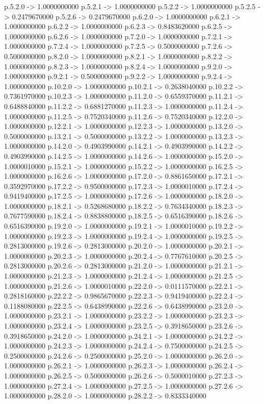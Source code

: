   p.5.2.0 -> 1.0000000000    p.5.2.1 -> 1.0000000000    p.5.2.2 -> 1.0000000000    p.5.2.5 -> 0.2479670000    p.5.2.6 -> 0.2479670000    p.6.2.0 -> 1.0000000000    p.6.2.1 -> 1.0000000000    p.6.2.2 -> 1.0000000000    p.6.2.3 -> 0.8483620000    p.6.2.5 -> 1.0000000000    p.6.2.6 -> 1.0000000000    p.7.2.0 -> 1.0000000000    p.7.2.1 -> 1.0000000000    p.7.2.4 -> 1.0000000000    p.7.2.5 -> 0.5000000000    p.7.2.6 -> 0.5000000000    p.8.2.0 -> 1.0000000000    p.8.2.1 -> 1.0000000000    p.8.2.2 -> 1.0000000000    p.8.2.3 -> 1.0000000000    p.8.2.4 -> 1.0000000000    p.9.2.0 -> 1.0000000000    p.9.2.1 -> 0.5000000000    p.9.2.2 -> 1.0000000000    p.9.2.4 -> 1.0000000000    p.10.2.0 -> 1.0000000000    p.10.2.1 -> 0.2638040000    p.10.2.2 -> 0.7361970000    p.10.2.3 -> 1.0000000000    p.11.2.0 -> 0.6559370000    p.11.2.1 -> 0.6488840000    p.11.2.2 -> 0.6881270000    p.11.2.3 -> 1.0000000000    p.11.2.4 -> 1.0000000000    p.11.2.5 -> 0.7520340000    p.11.2.6 -> 0.7520340000    p.12.2.0 -> 1.0000000000    p.12.2.1 -> 1.0000000000    p.12.2.3 -> 1.0000000000    p.13.2.0 -> 0.5000000000    p.13.2.1 -> 0.5000000000    p.13.2.2 -> 1.0000000000    p.13.2.3 -> 1.0000000000    p.14.2.0 -> 0.4903990000    p.14.2.1 -> 0.4903990000    p.14.2.2 -> 0.4903990000    p.14.2.5 -> 1.0000000000    p.14.2.6 -> 1.0000000000    p.15.2.0 -> 1.0000010000    p.15.2.1 -> 1.0000000000    p.15.2.2 -> 1.0000000000    p.16.2.5 -> 1.0000000000    p.16.2.6 -> 1.0000000000    p.17.2.0 -> 0.8861650000    p.17.2.1 -> 0.3592970000    p.17.2.2 -> 0.9500000000    p.17.2.3 -> 1.0000010000    p.17.2.4 -> 0.9419400000    p.17.2.5 -> 1.0000000000    p.17.2.6 -> 1.0000000000    p.18.2.0 -> 1.0000000000    p.18.2.1 -> 0.5268680000    p.18.2.2 -> 0.7634340000    p.18.2.3 -> 0.7677590000    p.18.2.4 -> 0.8838800000    p.18.2.5 -> 0.6516390000    p.18.2.6 -> 0.6516390000    p.19.2.0 -> 1.0000000000    p.19.2.1 -> 1.0000010000    p.19.2.2 -> 1.0000000000    p.19.2.3 -> 1.0000000000    p.19.2.4 -> 1.0000000000    p.19.2.5 -> 0.2813000000    p.19.2.6 -> 0.2813000000    p.20.2.0 -> 1.0000000000    p.20.2.1 -> 1.0000000000    p.20.2.3 -> 1.0000000000    p.20.2.4 -> 0.7767610000    p.20.2.5 -> 0.2813000000    p.20.2.6 -> 0.2813000000    p.21.2.0 -> 1.0000000000    p.21.2.1 -> 1.0000000000    p.21.2.3 -> 1.0000000000    p.21.2.4 -> 1.0000000000    p.21.2.5 -> 1.0000000000    p.21.2.6 -> 1.0000010000    p.22.2.0 -> 0.0111570000    p.22.2.1 -> 0.2818160000    p.22.2.2 -> 0.9865670000    p.22.2.3 -> 0.9419400000    p.22.2.4 -> 0.1188080000    p.22.2.5 -> 0.6438990000    p.22.2.6 -> 0.6438990000    p.23.2.0 -> 1.0000000000    p.23.2.1 -> 1.0000000000    p.23.2.2 -> 1.0000000000    p.23.2.3 -> 1.0000000000    p.23.2.4 -> 1.0000000000    p.23.2.5 -> 0.3918650000    p.23.2.6 -> 0.3918650000    p.24.2.0 -> 1.0000000000    p.24.2.1 -> 1.0000000000    p.24.2.2 -> 1.0000000000    p.24.2.3 -> 1.0000000000    p.24.2.4 -> 0.7500000000    p.24.2.5 -> 0.2500000000    p.24.2.6 -> 0.2500000000    p.25.2.0 -> 1.0000000000    p.26.2.0 -> 1.0000000000    p.26.2.1 -> 1.0000000000    p.26.2.3 -> 1.0000000000    p.26.2.4 -> 1.0000000000    p.26.2.5 -> 0.5000000000    p.26.2.6 -> 0.5000010000    p.27.2.3 -> 1.0000000000    p.27.2.4 -> 1.0000000000    p.27.2.5 -> 1.0000000000    p.27.2.6 -> 1.0000000000    p.28.2.0 -> 1.0000000000    p.28.2.2 -> 0.8333340000   